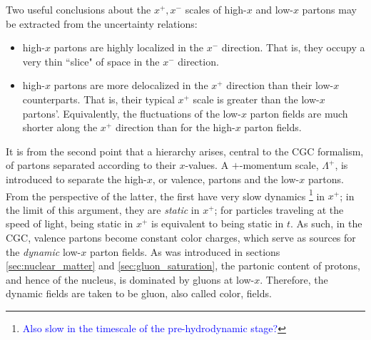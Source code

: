 Two useful conclusions about the $x^+,x^-$  scales of high-$x$ and low-$x$ partons may be extracted from the uncertainty relations:
\begin{itemize}
	\item[1)] high-$x$ partons are highly localized in the $x^-$ direction. That is, they occupy a very thin ``slice" of space in the $x^-$ direction.
	\item[2)] high-$x$ partons are more delocalized in the $x^+$ direction than their low-$x$ counterparts. That is, their typical $x^+$ scale %
is greater than the low-$x$ partons'. Equivalently, the fluctuations of the low-$x$ parton fields are much shorter along the $x^+$ direction than for the high-$x$ parton fields.
\end{itemize}


It is from the second point that a hierarchy arises, central to the \gls{CGC} formalism, of partons separated according to their $x$-values. A $+$-momentum scale, $\Lambda^+$, is introduced to separate the high-$x$, or valence, partons and the low-$x$ partons. From the perspective of the latter, the first have very slow dynamics\textcolor{red}{ \footnote{\textcolor{blue}{Also slow in the timescale of the pre-hydrodynamic stage?}}} in $x^+$; in the limit of this argument, they are \emph{static} in $x^+$; for particles traveling at the speed of light, being static in $x^+$ is equivalent to being static in $t$. As such, in the \gls{CGC}, valence partons become constant color charges, which serve as sources for the \emph{dynamic} low-$x$ parton fields.
As was introduced in sections \ref{sec:nuclear_matter} and \ref{sec:gluon_saturation}, the partonic content of protons, and hence of the nucleus, is dominated by gluons at low-$x$. Therefore, the dynamic fields are taken to be gluon, also called color, fields.


